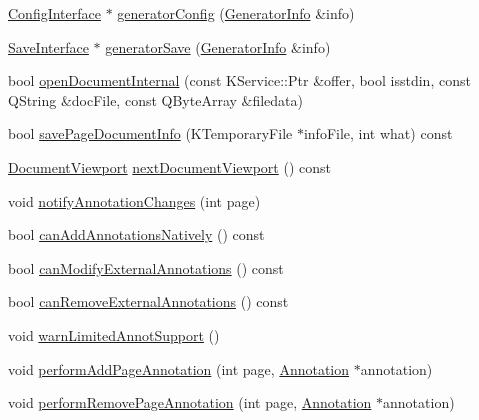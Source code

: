 \begin{DoxyCompactItemize}
\item 
\hyperlink{classOkular_1_1ConfigInterface}{Config\+Interface} $\ast$ \hyperlink{classOkular_1_1DocumentPrivate_ac40c31099a6fd5d842ae94e5557b9700}{generator\+Config} (\hyperlink{structGeneratorInfo}{Generator\+Info} \&info)
\item 
\hyperlink{classOkular_1_1SaveInterface}{Save\+Interface} $\ast$ \hyperlink{classOkular_1_1DocumentPrivate_a5f41002e3d3c2951033ae41e3443675b}{generator\+Save} (\hyperlink{structGeneratorInfo}{Generator\+Info} \&info)
\item 
bool \hyperlink{classOkular_1_1DocumentPrivate_a446649f974127476851f6a1d55e49d4d}{open\+Document\+Internal} (const K\+Service\+::\+Ptr \&offer, bool isstdin, const Q\+String \&doc\+File, const Q\+Byte\+Array \&filedata)
\item 
bool \hyperlink{classOkular_1_1DocumentPrivate_a7d06a43560a005a4a4a98ab1dafda83f}{save\+Page\+Document\+Info} (K\+Temporary\+File $\ast$info\+File, int what) const 
\item 
\hyperlink{classOkular_1_1DocumentViewport}{Document\+Viewport} \hyperlink{classOkular_1_1DocumentPrivate_a53d9d28d2ad9555b577ab0c9b1a1c142}{next\+Document\+Viewport} () const 
\item 
void \hyperlink{classOkular_1_1DocumentPrivate_a1ca2b2788a81ae1bf852d5eab1de541c}{notify\+Annotation\+Changes} (int page)
\item 
bool \hyperlink{classOkular_1_1DocumentPrivate_ac0e0b9633df5fbd632e9ffa865b0f04b}{can\+Add\+Annotations\+Natively} () const 
\item 
bool \hyperlink{classOkular_1_1DocumentPrivate_a6d7377eb17bd81f5272ec23aa2fb03ac}{can\+Modify\+External\+Annotations} () const 
\item 
bool \hyperlink{classOkular_1_1DocumentPrivate_ac0c69229f58900112e34858d7b2059dd}{can\+Remove\+External\+Annotations} () const 
\item 
void \hyperlink{classOkular_1_1DocumentPrivate_abfb2abf66a3eb0536063c818a8e793e9}{warn\+Limited\+Annot\+Support} ()
\item 
void \hyperlink{classOkular_1_1DocumentPrivate_a374e55b575f2386536cd438bd2338b33}{perform\+Add\+Page\+Annotation} (int page, \hyperlink{classOkular_1_1Annotation}{Annotation} $\ast$annotation)
\item 
void \hyperlink{classOkular_1_1DocumentPrivate_a52fc440677b41a7717bff1cec9593d33}{perform\+Remove\+Page\+Annotation} (int page, \hyperlink{classOkular_1_1Annotation}{Annotation} $\ast$annotation)
\item 

\end{DoxyCompactItemize}
